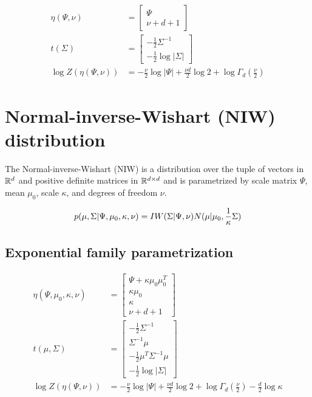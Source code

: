 \begin{align*}
    \eta(\Psi, \nu) &= \begin{bmatrix}\Psi \\ \nu + d + 1\end{bmatrix} \\
    t(\Sigma) &= \begin{bmatrix}-\frac{1}{2}\Sigma^{-1} \\ -\frac{1}{2}\log |\Sigma|\end{bmatrix} \\
    \log Z(\eta(\Psi, \nu)) &= -\frac{\nu}{2}\log |\Psi| + \frac{\nu d}{2}\log 2 + \log \Gamma_d\left(\frac{\nu}{2}\right)
\end{align*}

\section{Normal-inverse-Wishart (NIW) distribution}
\label{sec:stats-niw}

The Normal-inverse-Wishart (NIW) is a
distribution over the tuple of vectors in $\mathbb{R}^d$ and 
positive definite matrices in $\mathbb{R}^{d \times d}$
and is parametrized by
scale matrix $\Psi$,
mean $\mu_0$,
scale $\kappa$,
and degrees of freedom $\nu$.

\begin{align}
        p(\mu, \Sigma | \Psi, \mu_0, \kappa, \nu) &= IW(\Sigma|\Psi,\nu)N(\mu|\mu_0,\frac{1}{\kappa}\Sigma) \\
\end{align}

\subsection*{Exponential family parametrization}
\begin{align*}
    \eta(\Psi, \mu_0, \kappa, \nu) &= \begin{bmatrix}\Psi + \kappa\mu_0\mu_0^T\\\kappa \mu_0\\\kappa\\\nu + d + 1\end{bmatrix} \\
    t(\mu, \Sigma) &= \begin{bmatrix}-\frac{1}{2}\Sigma^{-1}\\\Sigma^{-1}\mu\\-\frac{1}{2}\mu^T\Sigma^{-1}\mu\\-\frac{1}{2}\log|\Sigma|\end{bmatrix} \\
    \log Z(\eta(\Psi, \nu)) &= -\frac{\nu}{2}\log |\Psi| + \frac{\nu d}{2}\log 2 + \log \Gamma_d\left(\frac{\nu}{2}\right) - \frac{d}{2} \log \kappa
\end{align*}

